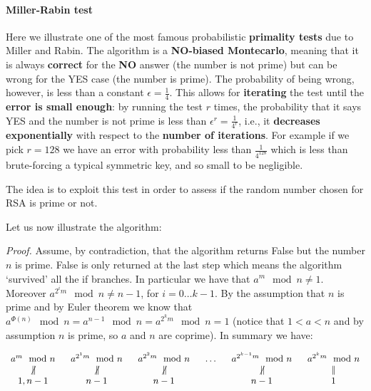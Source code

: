 \paragraph{Miller-Rabin test}
Here we illustrate one of the most famous probabilistic \textbf{primality tests} due to Miller and Rabin. The algorithm is a \textbf{NO-biased Montecarlo}, meaning that it is always \textbf{correct} for the \textbf{NO} answer (the number is not prime) but can be wrong for the YES case (the number is prime). The probability of being wrong, however, is less than a constant $\epsilon = \frac{1}{4}$. This allows for \textbf{iterating} the test until the \textbf{error is small enough}: by running the test $r$ times, the probability that it says YES and the number is not prime is less than $\epsilon^r = \frac{1}{4^r}$, i.e., it \textbf{decreases} \textbf{exponentially} with respect to the \textbf{number of iterations}. For example if we pick $r = 128$ we have an error with probability less than $\frac{1}{4^{128}}$ which is less than brute-forcing a typical symmetric key, and so small to be negligible.

The idea is to exploit this test in order to assess if the random number chosen for RSA is prime or not.

Let us now illustrate the algorithm:




\textit{Proof.} Assume, by contradiction, that the algorithm returns False but the number $n$ is prime. False is only returned at the last step which means the algorithm ‘survived’ all the if branches. In particular we have that $a^m \mod n \neq 1$. Moreover $a^{2^i m} \mod n \neq n-1$, for $i=0\ldots k-1$. By the assumption that $n$ is prime and by Euler theorem we know that $a^{\Phi(n)} \mod n = a^{n-1} \mod n = a^{2^k m} \mod n = 1$ (notice that $1 < a < n$ and by assumption $n$ is prime, so $a$ and $n$ are coprime). In summary we have:

$$\begin{array}{c@{~~~~~}c@{~~~~~}c@{~~~~~}c@{~~~~~}c@{~~~~~}c}a^m \mod n & a^{2^1m} \mod n & a^{2^2m} \mod n & \ldots & a^{2^{k-1}m} \mod n & a^{2^k m} \mod n \\ \not\,\parallel &\not\,\parallel &\not\,\parallel & & \not\,\parallel &\parallel \\ 1,n-1 & n-1 & n-1 & & n-1 & 1\end{array}$$

